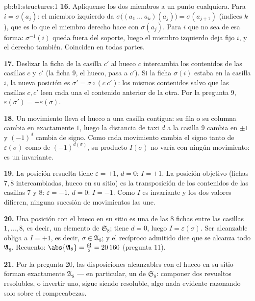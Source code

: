 \begin{solution}{pb:b1:structures:1}
\textbf{16.} Aplíquense los dos miembros a un punto cualquiera. Para
$i = \sigma(a_j)$: el miembro izquierdo da
$\sigma\bigl((a_1\ \dots\ a_k)(a_j)\bigr) = \sigma(a_{j+1})$ (índices
 $k$), que es lo que el miembro derecho hace con $\sigma(a_j)$.
Para $i$ que no sea de esa forma: $\sigma^{-1}(i)$ queda fuera del
soporte, luego el miembro izquierdo deja fijo $i$, y el derecho
también. Coinciden en todas partes.

\textbf{17.} Deslizar la ficha de la casilla $c'$ al hueco $c$
intercambia los contenidos de las casillas $c$ y $c'$ (la ficha $9$,
el hueco, pasa a $c'$). Si la ficha $\sigma(i)$ estaba en la casilla
$i$, la nueva posición es $\sigma' = \sigma \circ (c\ c')$: los mismos
contenidos salvo que las casillas $c, c'$ leen cada una el contenido
anterior de la otra. Por la pregunta 9,
$\varepsilon(\sigma') = -\varepsilon(\sigma)$.

\textbf{18.} Un movimiento lleva el hueco a una casilla contigua: su
fila o su columna cambia en exactamente $1$, luego la distancia de taxi
$d$ a la casilla $9$ cambia en $\pm1$ y $(-1)^d$ cambia de signo. Como
cada movimiento cambia el signo tanto de $\varepsilon(\sigma)$ como de
$(-1)^{d(\sigma)}$, su producto $I(\sigma)$ no varía con ningún
movimiento: es un invariante.

\textbf{19.} La posición resuelta tiene $\varepsilon = +1$, $d = 0$:
$I = +1$. La posición objetivo (fichas $7, 8$ intercambiadas, hueco en
su sitio) es la transposición de los contenidos de las casillas $7$ y
$8$: $\varepsilon = -1$, $d = 0$: $I = -1$. Como $I$ es invariante y
los dos valores difieren, ninguna sucesión de movimientos las une.

\textbf{20.} Una posición con el hueco en su sitio es una
 de las $8$ fichas entre las casillas $1, \dots, 8$, es
decir, un elemento de $\mathfrak S_8$; tiene $d = 0$, luego
$I = \varepsilon(\sigma)$. Ser alcanzable obliga a $I = +1$, es decir,
$\sigma \in \mathfrak A_8$; y el recíproco admitido dice que se alcanza
todo $\mathfrak A_8$. Recuento: $\abs{\mathfrak A_8} = \frac{8!}2 =
20\,160$ (pregunta 11).

\textbf{21.} Por la pregunta 20, las disposiciones alcanzables con el
hueco en su sitio forman exactamente $\mathfrak A_8$ --- en particular,
un \emph{} de $\mathfrak S_8$: componer dos revueltos
resolubles, o invertir uno, sigue siendo resoluble, algo nada evidente
razonando solo sobre el rompecabezas.


\end{solution}
